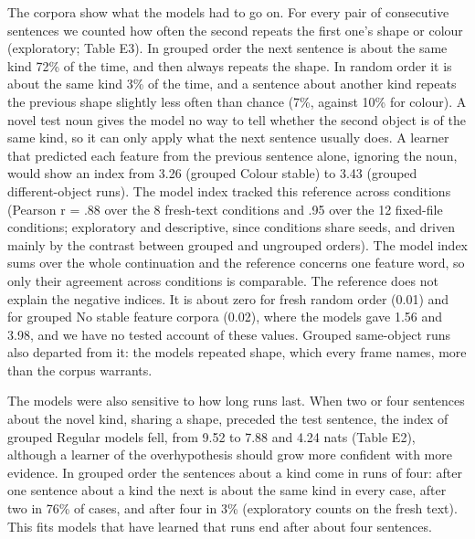 The corpora show what the models had to go on. For every pair of consecutive sentences we counted how often the second repeats the first one's shape or colour (exploratory; Table E3). In grouped order the next sentence is about the same kind 72\% of the time, and then always repeats the shape. In random order it is about the same kind 3\% of the time, and a sentence about another kind repeats the previous shape slightly less often than chance (7\%, against 10\% for colour). A novel test noun gives the model no way to tell whether the second object is of the same kind, so it can only apply what the next sentence usually does. A learner that predicted each feature from the previous sentence alone, ignoring the noun, would show an index from \textminus{}3.26 (grouped Colour stable) to 3.43 (grouped different-object runs). The model index tracked this reference across conditions (Pearson r = .88 over the 8 fresh-text conditions and .95 over the 12 fixed-file conditions; exploratory and descriptive, since conditions share seeds, and driven mainly by the contrast between grouped and ungrouped orders). The model index sums over the whole continuation and the reference concerns one feature word, so only their agreement across conditions is comparable. The reference does not explain the negative indices. It is about zero for fresh random order (\textminus{}0.01) and for grouped No stable feature corpora (0.02), where the models gave \textminus{}1.56 and \textminus{}3.98, and we have no tested account of these values. Grouped same-object runs also departed from it: the models repeated shape, which every frame names, more than the corpus warrants.

The models were also sensitive to how long runs last. When two or four sentences about the novel kind, sharing a shape, preceded the test sentence, the index of grouped Regular models fell, from 9.52 to 7.88 and 4.24 nats (Table E2), although a learner of the overhypothesis should grow more confident with more evidence. In grouped order the sentences about a kind come in runs of four: after one sentence about a kind the next is about the same kind in every case, after two in 76\% of cases, and after four in 3\% (exploratory counts on the fresh text). This fits models that have learned that runs end after about four sentences.

